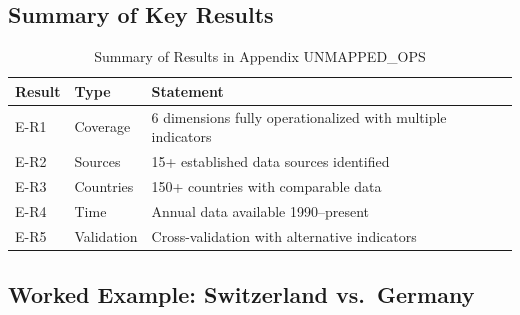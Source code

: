 \subsection{Summary of Key Results}
\label{sec:E-results}

\begin{table}[htbp]
\centering
\caption{Summary of Results in Appendix UNMAPPED_OPS}
\label{tab:E-results}
\renewcommand{\arraystretch}{1.2}
\begin{tabular}{@{}llp{7cm}@{}}
\toprule
\textbf{Result} & \textbf{Type} & \textbf{Statement} \\
\midrule
E-R1 & Coverage & 6 dimensions fully operationalized with multiple indicators \\
E-R2 & Sources & 15+ established data sources identified \\
E-R3 & Countries & 150+ countries with comparable data \\
E-R4 & Time & Annual data available 1990--present \\
E-R5 & Validation & Cross-validation with alternative indicators \\
\bottomrule
\end{tabular}
\end{table}


\subsection{Worked Example: Switzerland vs.\ Germany}
\label{sec:E-example}

